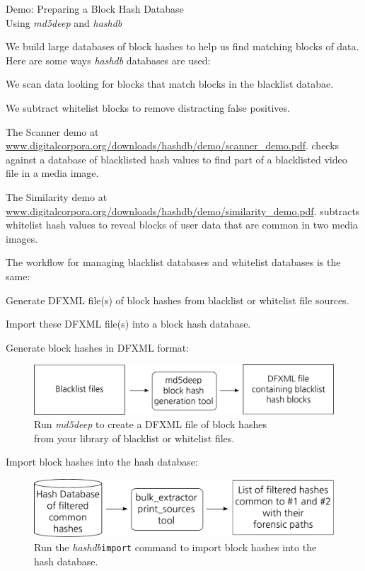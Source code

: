 \documentclass[12pt,twoside]{article}
\newcommand{\hdb}{\emph{hashdb}\xspace}
\newcommand{\mdd}{\emph{md5deep}\xspace}
\begin{document}
\begin{center}
\Large Demo: Preparing a Block Hash Database \\
\large Using \mdd and \hdb
\end{center}

We build large databases of block hashes
to help us find matching blocks of data.
Here are some ways \hdb databases are used:
\begin{compactitem}
\item We scan data looking for blocks that match blocks in the blacklist databae.
\item We subtract whitelist blocks to remove distracting false positives.
\end{compactitem}
The Scanner demo at
\url{www.digitalcorpora.org/downloads/hashdb/demo/scanner\_demo.pdf}.
checks against a database of blacklisted hash values
to find part of a blacklisted video file in a media image.

The Similarity demo at
\url{www.digitalcorpora.org/downloads/hashdb/demo/similarity\_demo.pdf}.
subtracts whitelist hash values
to reveal blocks of user data that are common in two media images.

The workflow for managing blacklist databases and whitelist databases
is the same:
\begin{compactenum}
\item Generate DFXML file(s) of block hashes
from blacklist or whitelist file sources.
\item Import these DFXML file(s) into a block hash database.
\end{compactenum}

Generate block hashes in DFXML format:

\begin{figure}[H]
  \center
  \includegraphics[scale=0.6]{drawings/md5deep}
  \caption*{Run \mdd to create a DFXML file of block hashes \\
            from your library of blacklist or whitelist files.}
\end{figure}

Import block hashes into the hash database:

\begin{figure}[H]
  \center
  \includegraphics[scale=0.6]{drawings/import}
  \caption*{Run the \hdb \texttt{import} command
            to import block hashes into the hash database.}
\end{figure}
\end{document}
